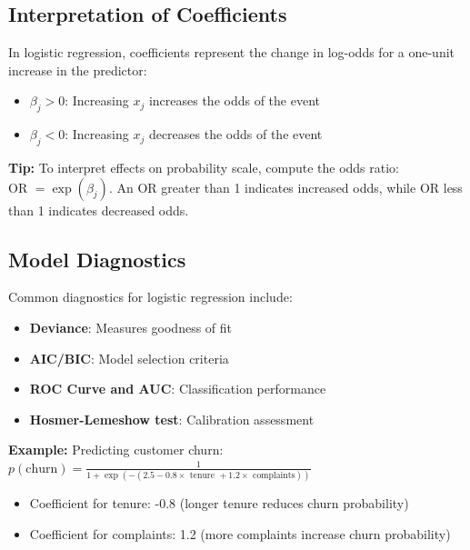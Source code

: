 \documentclass[
]{article}
\begin{document}
\textbf{ }

\subsection{Interpretation of Coefficients}

In logistic regression, coefficients represent the change in log-odds
for a one-unit increase in the predictor:

\begin{itemize}
\item
  \(\beta_{j} > 0\): Increasing \(x_{j}\) increases the odds of the
  event
\item
  \(\beta_{j} < 0\): Increasing \(x_{j}\) decreases the odds of the
  event
\end{itemize}

\textbf{Tip: } To interpret effects on probability scale, compute the
odds ratio: \(\text{OR } = \exp(\beta_{j})\). An OR greater than 1
indicates increased odds, while OR less than 1 indicates decreased odds.

\textbf{ }

\subsection{Model Diagnostics}

Common diagnostics for logistic regression include:

\begin{itemize}
\item
  \textbf{Deviance}: Measures goodness of fit
\item
  \textbf{AIC/BIC}: Model selection criteria
\item
  \textbf{ROC Curve and AUC}: Classification performance
\item
  \textbf{Hosmer-Lemeshow test}: Calibration assessment
\end{itemize}

\textbf{Example: } Predicting customer churn:
\(p\left( \text{churn} \right) = \frac{1}{1 + \exp( - \left( 2.5 - 0.8 \times \text{ tenure } + 1.2 \times \text{ complaints} \right))}\)

\begin{itemize}
\item
  Coefficient for tenure: -0.8 (longer tenure reduces churn probability)
\item
  Coefficient for complaints: 1.2 (more complaints increase churn
  probability)
\end{itemize}
\end{document}
